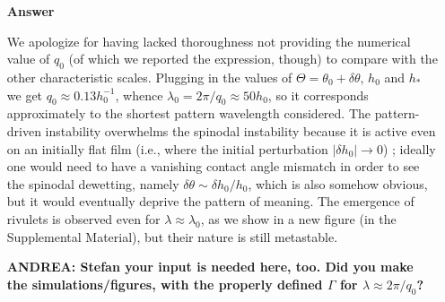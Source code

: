 \documentclass[12pt,english]{article}
\begin{document}
\begin{itemize}
\item[ \textbf{{Answer}}]
{
We apologize for having lacked thoroughness not providing the numerical 
value of $q_0$ (of which we reported the expression, though) to compare with the 
other characteristic scales. Plugging in the values of $\Theta = \theta_0 + \delta \theta$, 
$h_0$ and $h_{\ast}$ we get $q_0 \approx 0.13 h_0^{-1}$, whence 
$\lambda_0 = 2\pi/q_0 \approx 50 h_0$, so it corresponds approximately to the 
shortest pattern wavelength considered. The pattern-driven instability overwhelms the spinodal instability because it is active even on an initially
flat film 
(i.e., where the initial perturbation $|\delta h_0| \rightarrow 0$) 
\cite{KonnurPRL2000,KarguptaLangmuir2000,KarguptaPRL2001}; ideally one would need to have a vanishing 
contact angle mismatch in order to see the spinodal dewetting, namely $\delta \theta \sim \delta h_0/h_0$,
which is also somehow obvious, but it would eventually deprive the pattern of meaning. 
The emergence of rivulets is observed even for $\lambda \approx \lambda_0$, as we show in a new figure
(in the Supplemental Material), but their nature is still metastable. 

{\bf ANDREA: Stefan your input is needed here, too. Did you make the simulations/figures, with the 
properly defined $\Gamma$ for $\lambda \approx 2 \pi/q_0$?}
}



\end{itemize}
\end{document}
